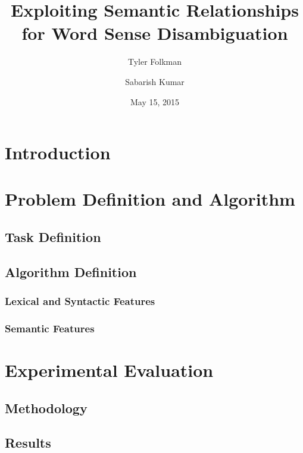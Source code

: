 \documentclass[12pt]{article}
\title{Exploiting Semantic Relationships for Word Sense Disambiguation}
\author{
       Tyler Folkman
            \and
	Sabarish Kumar
}
\date{May 15, 2015}
\begin{document}
\maketitle




\begin{abstract}


\end{abstract}




\section{Introduction}




\section{Problem Definition and Algorithm}


\subsection{Task Definition}


\subsection{Algorithm Definition}


\subsubsection{Lexical and Syntactic Features}


\subsubsection{Semantic Features}




\section{Experimental Evaluation}


\subsection{Methodology}


\subsection{Results}
\end{document}
